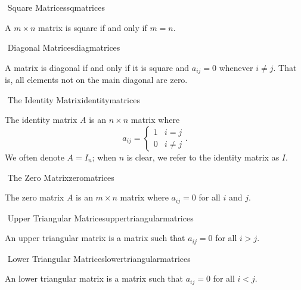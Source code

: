         \begin{definition}{\Stop\,\,Square Matrices}{sqmatrices}
        
            A \(m\times n\) matrix is square if and only if \(m=n\).
        
        \end{definition}
        \begin{definition}{\Stop\,\,Diagonal Matrices}{diagmatrices}
        
            A matrix is diagonal if and only if it is square and \(a_{ij}=0\) whenever \(i\neq j\). That is, all elements not on the main diagonal are zero.
        
        \end{definition}
        \begin{definition}{\Stop\,\,The Identity Matrix}{identitymatrices}
        
            The identity matrix \(A\) is an \(n\times n\) matrix where
            \begin{equation*}
                a_{ij}=\begin{cases} 1 & i=j \\ 0 & i\neq j \end{cases}.
            \end{equation*}
            We often denote \(A=I_n\); when \(n\) is clear, we refer to the identity matrix as \(I\).
        
        \end{definition}
        \begin{definition}{\Stop\,\,The Zero Matrix}{zeromatrices}
        
            The zero matrix \(A\) is an \(m\times n\) matrix where \(a_{ij}=0\) for all \(i\) and \(j\).
            
        \end{definition}
        \begin{definition}{\Stop\,\,Upper Triangular Matrices}{uppertriangularmatrices}
        
            An upper triangular matrix is a matrix such that \(a_{ij}=0\) for all \(i>j\).
            
        \end{definition}
        \begin{definition}{\Stop\,\,Lower Triangular Matrices}{lowertriangularmatrices}
        
            An lower triangular matrix is a matrix such that \(a_{ij}=0\) for all \(i<j\).
            
        \end{definition}
